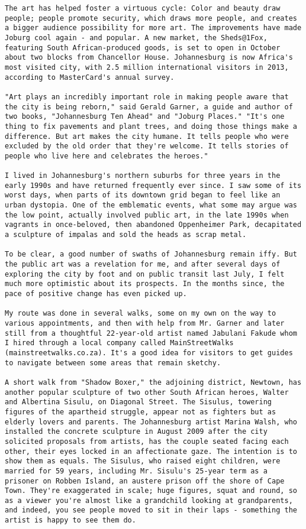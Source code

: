 \begin{lstlisting}
The art has helped foster a virtuous cycle: Color and beauty draw people; people promote security, which draws more people, and creates a bigger audience possibility for more art. The improvements have made Joburg cool again - and popular. A new market, the Sheds@1Fox, featuring South African-produced goods, is set to open in October about two blocks from Chancellor House. Johannesburg is now Africa's most visited city, with 2.5 million international visitors in 2013, according to MasterCard's annual survey.

"Art plays an incredibly important role in making people aware that the city is being reborn," said Gerald Garner, a guide and author of two books, "Johannesburg Ten Ahead" and "Joburg Places." "It's one thing to fix pavements and plant trees, and doing those things make a difference. But art makes the city humane. It tells people who were excluded by the old order that they're welcome. It tells stories of people who live here and celebrates the heroes."

I lived in Johannesburg's northern suburbs for three years in the early 1990s and have returned frequently ever since. I saw some of its worst days, when parts of its downtown grid began to feel like an urban dystopia. One of the emblematic events, what some may argue was the low point, actually involved public art, in the late 1990s when vagrants in once-beloved, then abandoned Oppenheimer Park, decapitated a sculpture of impalas and sold the heads as scrap metal.

To be clear, a good number of swaths of Johannesburg remain iffy. But the public art was a revelation for me, and after several days of exploring the city by foot and on public transit last July, I felt much more optimistic about its prospects. In the months since, the pace of positive change has even picked up.

My route was done in several walks, some on my own on the way to various appointments, and then with help from Mr. Garner and later still from a thoughtful 22-year-old artist named Jabulani Fakude whom I hired through a local company called MainStreetWalks (mainstreetwalks.co.za). It's a good idea for visitors to get guides to navigate between some areas that remain sketchy.

A short walk from "Shadow Boxer," the adjoining district, Newtown, has another popular sculpture of two other South African heroes, Walter and Albertina Sisulu, on Diagonal Street. The Sisulus, towering figures of the apartheid struggle, appear not as fighters but as elderly lovers and parents. The Johannesburg artist Marina Walsh, who installed the concrete sculpture in August 2009 after the city solicited proposals from artists, has the couple seated facing each other, their eyes locked in an affectionate gaze. The intention is to show them as equals. The Sisulus, who raised eight children, were married for 59 years, including Mr. Sisulu's 25-year term as a prisoner on Robben Island, an austere prison off the shore of Cape Town. They're exaggerated in scale; huge figures, squat and round, so as a viewer you're almost like a grandchild looking at grandparents, and indeed, you see people moved to sit in their laps - something the artist is happy to see them do.


\end{lstlisting}
